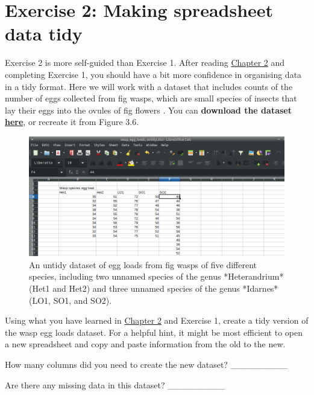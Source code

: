 \documentclass[
]{scrbook}
\begin{document}
\hypertarget{exercise-2-making-spreadsheet-data-tidy}{%
\section{Exercise 2: Making spreadsheet data tidy}\label{exercise-2-making-spreadsheet-data-tidy}}

Exercise 2 is more self-guided than Exercise 1.
After reading \protect\hyperlink{Chapter_2}{Chapter 2} and completing Exercise 1, you should have a bit more confidence in organising data in a tidy format.
Here we will work with a dataset that includes counts of the number of eggs collected from fig wasps, which are small species of insects that lay their eggs into the ovules of fig flowers \citep{Weiblen2002}.
You can \textbf{download the dataset \href{https://raw.githubusercontent.com/bradduthie/statistical_techniques/main/data/wasp_egg_loads_untidy.csv}{here}}, or recreate it from Figure 3.6.

\begin{figure}
\includegraphics[width=1\linewidth]{img/wasp_egg_loads_untidy} \caption{An untidy dataset of egg loads from fig wasps of five different species, including two unnamed species of the genus *Heterandrium* (Het1 and Het2) and three unnamed species of the genus *Idarnes* (LO1, SO1, and SO2).}\label{fig:unnamed-chunk-16}
\end{figure}

Using what you have learned in \protect\hyperlink{Chapter_2}{Chapter 2} and Exercise 1, create a tidy version of the wasp egg loads dataset.
For a helpful hint, it might be most efficient to open a new spreadsheet and copy and paste information from the old to the new.

How many columns did you need to create the new dataset? \_\_\_\_\_\_\_\_\_

Are there any missing data in this dataset? \_\_\_\_\_\_\_\_\_
\end{document}
